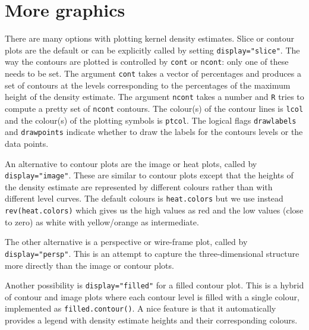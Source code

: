 \documentclass[a4paper,11pt]{article}
\begin{document}

\section{More graphics}
There are many options with plotting kernel density estimates. 
Slice or contour plots are the default or can be explicitly called by setting
\texttt{display="slice"}. The way the contours are plotted is controlled by
\texttt{cont} or \texttt{ncont}: only one of these needs to be set. 
The argument 
\texttt{cont} takes a vector of percentages and produces a set of contours
at the levels corresponding to the percentages of the maximum height of the 
density estimate. The argument 
\texttt{ncont} takes a number and \texttt{R} tries to 
compute a pretty set of \texttt{ncont} contours.  
The colour(s) of the contour lines is \texttt{lcol} and
the colour(s) of the plotting symbols is \texttt{ptcol}.
The logical flags \texttt{drawlabels} and \texttt{drawpoints} indicate
whether to draw the labels for the contours levels or the data points.

An alternative to contour plots are the image or heat plots,
called by \texttt{display="image"}.  These 
are similar to contour plots except that the heights of the density 
estimate are represented by different colours rather than with
different level curves. The default colours is \texttt{heat.colors}
but we use instead \texttt{rev(heat.colors)} which gives us the high 
values as red and the low values (close to zero) as white with
yellow/orange as intermediate. 

The other alternative is a perspective or wire-frame plot, 
called by \texttt{display="persp"}. This is an attempt
to capture the three-dimensional structure more directly than the 
image or contour plots.

Another possibility is \texttt{display="filled"} for a filled contour plot.
This is a hybrid of contour and image plots where each contour level is filled
with a single colour, implemented as \texttt{filled.contour()}. A nice
feature is that it automatically provides a legend with density estimate heights
and their corresponding colours.  

\end{document}

